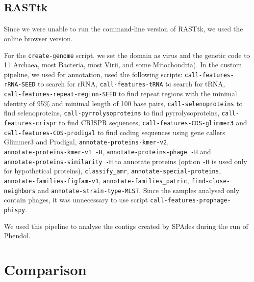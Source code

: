 \subsection{RASTtk}
\paragraph*{}
Since we were unable to run the command-line version of RASTtk, we used the online browser version.

For the \texttt{create-genome} script, we set the domain as virus and the genetic code to 11 Archaea, most Bacteria, most Virii, and some Mitochondria). In the custom pipeline, we used for annotation, used the following scripts: \texttt{call-features-rRNA-SEED} to search for rRNA, \texttt{call-features-tRNA} to search for tRNA,\\ \texttt{call-features-repeat-region-SEED} to find repeat regions with the minimal identity of 95\% and minimal length of 100 base pairs, \texttt{call-selenoproteins} to find selenoproteins, \texttt{call-pyrrolysoproteins} to find pyrrolysoproteins, \texttt{call-features-crispr} to find CRISPR sequences, \texttt{call-features-CDS-glimmer3} and\\ \texttt{call-features-CDS-prodigal} to find coding sequences using gene callers Glimmer3 and Prodigal, \texttt{annotate-proteins-kmer-v2},\\ \texttt{annotate-proteins-kmer-v1 -H}, \texttt{annotate-proteins-phage -H} and\\ \texttt{annotate-proteins-similarity -H} to annotate proteins (option \texttt{-H} is used only for hypothetical proteins), \texttt{classify\_amr}, \texttt{annotate-special-proteins},\\ \texttt{annotate-families-figfam-v1}, \texttt{annotate-families\_patric}, \texttt{find-close-neighbors} and \texttt{annotate-strain-type-MLST}. Since the samples analysed only contain phages, it was unnecessary to use script \texttt{call-features-prophage-phispy}.

We used this pipeline to analyse the contigs created by SPAdes during the run of Phendol.

\section{Comparison}
